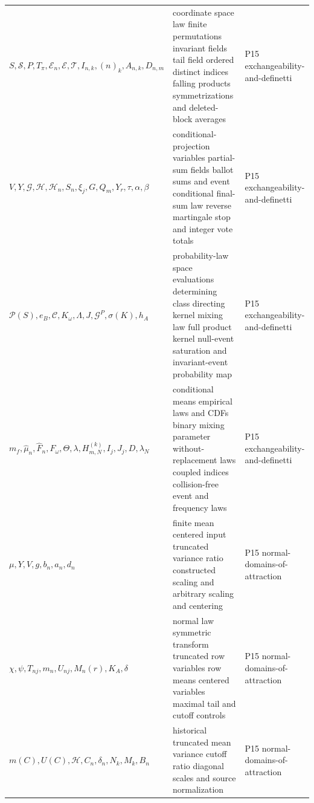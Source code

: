 \begin{longtable}{@{}p{}p{}p{}@{}}
\(S,\allowbreak \mathcal S,\allowbreak P,\allowbreak T_\pi,\allowbreak \mathcal E_n,\allowbreak \mathcal E,\allowbreak \mathcal T,\allowbreak I_{n,k},\allowbreak (n)_k,\allowbreak A_{n,k},\allowbreak D_{n,m}\) & coordinate space law finite permutations invariant fields tail field ordered distinct indices falling products symmetrizations and deleted-block averages & P15 exchangeability-\allowbreak{}and-\allowbreak{}definetti \\
\(V,\allowbreak Y,\allowbreak \mathcal G,\allowbreak \mathcal H,\allowbreak \mathcal H_n,\allowbreak S_n,\allowbreak \xi_j,\allowbreak G,\allowbreak Q_m,\allowbreak Y_r,\allowbreak \tau,\allowbreak \alpha,\allowbreak \beta\) & conditional-projection variables partial-sum fields ballot sums and event conditional final-sum law reverse martingale stop and integer vote totals & P15 exchangeability-\allowbreak{}and-\allowbreak{}definetti \\
\(\mathscr P(S),\allowbreak e_B,\allowbreak \mathcal C,\allowbreak K_\omega,\allowbreak \Lambda,\allowbreak J,\allowbreak \mathcal G^P,\allowbreak \sigma(K),\allowbreak h_A\) & probability-law space evaluations determining class directing kernel mixing law full product kernel null-event saturation and invariant-event probability map & P15 exchangeability-\allowbreak{}and-\allowbreak{}definetti \\
\(m_f,\allowbreak \widehat\mu_n,\allowbreak \widehat F_n,\allowbreak F_\omega,\allowbreak \Theta,\allowbreak \lambda,\allowbreak H_{m,N}^{(k)},\allowbreak I_j,\allowbreak J_j,\allowbreak D,\allowbreak \lambda_N\) & conditional means empirical laws and CDFs binary mixing parameter without-replacement laws coupled indices collision-free event and frequency laws & P15 exchangeability-\allowbreak{}and-\allowbreak{}definetti \\
\(\mu,\allowbreak Y,\allowbreak V,\allowbreak g,\allowbreak b_n,\allowbreak a_n,\allowbreak d_n\) & finite mean centered input truncated variance ratio constructed scaling and arbitrary scaling and centering & P15 normal-\allowbreak{}domains-\allowbreak{}of-\allowbreak{}attraction \\
\(\chi,\allowbreak \psi,\allowbreak T_{nj},\allowbreak m_n,\allowbreak U_{nj},\allowbreak M_n(r),\allowbreak K_A,\allowbreak \delta\) & normal law symmetric transform truncated row variables row means centered variables maximal tail and cutoff controls & P15 normal-\allowbreak{}domains-\allowbreak{}of-\allowbreak{}attraction \\
\(m(C),\allowbreak U(C),\allowbreak \mathcal H,\allowbreak C_n,\allowbreak \delta_n,\allowbreak N_k,\allowbreak M_k,\allowbreak B_n\) & historical truncated mean variance cutoff ratio diagonal scales and source normalization & P15 normal-\allowbreak{}domains-\allowbreak{}of-\allowbreak{}attraction \\

\end{longtable}
